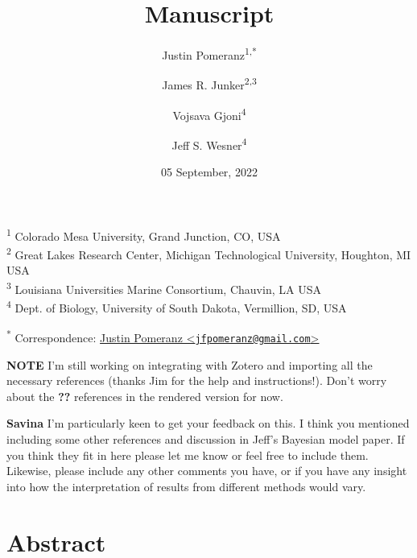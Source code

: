 \documentclass[
]{article}
\title{Manuscript}
\author{Justin Pomeranz\textsuperscript{1,*} \and James R.
Junker\textsuperscript{2,3} \and Vojsava
Gjoni\textsuperscript{4} \and Jeff S. Wesner\textsuperscript{4}}
\date{05 September, 2022}
\begin{document}
\maketitle

{
\setcounter{tocdepth}{2}
\tableofcontents
}
\textsuperscript{1} Colorado Mesa University, Grand Junction, CO, USA\\
\textsuperscript{2} Great Lakes Research Center, Michigan Technological
University, Houghton, MI USA\\
\textsuperscript{3} Louisiana Universities Marine Consortium, Chauvin,
LA USA\\
\textsuperscript{4} Dept. of Biology, University of South Dakota,
Vermillion, SD, USA

\textsuperscript{*} Correspondence:
\href{mailto:jfpomeranz@gmail.com}{Justin Pomeranz
\textless{}\href{mailto:jfpomeranz@gmail.com}{\nolinkurl{jfpomeranz@gmail.com}}\textgreater{}}

\textbf{NOTE} I'm still working on integrating with Zotero and importing
all the necessary references (thanks Jim for the help and
instructions!). Don't worry about the \textbf{??} references in the
rendered version for now.

\textbf{Savina} I'm particularly keen to get your feedback on this. I
think you mentioned including some other references and discussion in
Jeff's Bayesian model paper. If you think they fit in here please let me
know or feel free to include them. Likewise, please include any other
comments you have, or if you have any insight into how the
interpretation of results from different methods would vary.

\hypertarget{abstract}{%
\section{Abstract}\label{abstract}}
\end{document}
